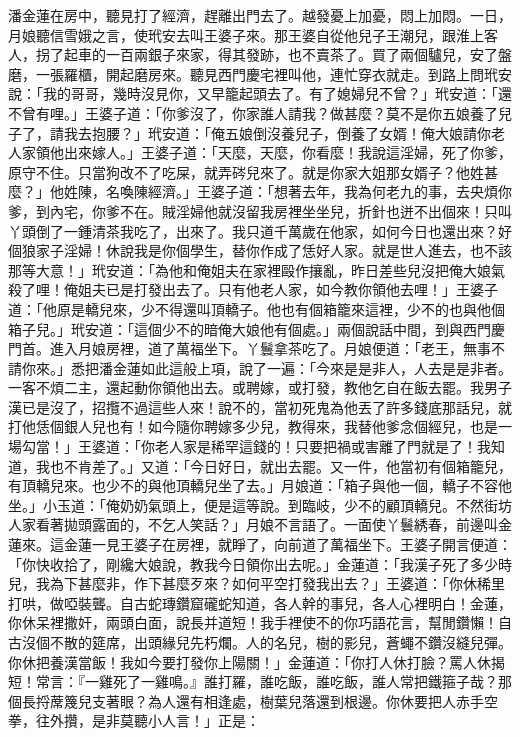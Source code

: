 \begin{showcontents}{}
潘金蓮在房中，聽見打了經濟，趕離出門去了。越發憂上加憂，悶上加悶。一日，月娘聽信雪娥之言，使玳安去叫王婆子來。那王婆自從他兒子王潮兒，跟淮上客人，拐了起車的一百兩銀子來家，得其發跡，也不賣茶了。買了兩個驢兒，安了盤磨，一張羅櫃，開起磨房來。聽見西門慶宅裡叫他，連忙穿衣就走。到路上問玳安說：「我的哥哥，幾時沒見你，又早籠起頭去了。有了媳婦兒不曾？」玳安道：「還不曾有哩。」王婆子道：「你爹沒了，你家誰人請我？做甚麼？莫不是你五娘養了兒子了，請我去抱腰？」玳安道：「俺五娘倒沒養兒子，倒養了女婿！俺大娘請你老人家領他出來嫁人。」王婆子道：「天麼，天麼，你看麼！我說這淫婦，死了你爹，原守不住。只當狗改不了吃屎，就弄硶兒來了。就是你家大姐那女婿子？他姓甚麼？」他姓陳，名喚陳經濟。」王婆子道：「想著去年，我為何老九的事，去央煩你爹，到內宅，你爹不在。賊淫婦他就沒留我房裡坐坐兒，折針也迸不出個來！只叫丫頭倒了一鍾清茶我吃了，出來了。我只道千萬歲在他家，如何今日也還出來？好個狼家子淫婦！休說我是你個學生，替你作成了恁好人家。就是世人進去，也不該那等大意！」玳安道：「為他和俺姐夫在家裡毆作攘亂，昨日差些兒沒把俺大娘氣殺了哩！俺姐夫已是打發出去了。只有他老人家，如今教你領他去哩！」王婆子道：「他原是轎兒來，少不得還叫頂轎子。他也有個箱籠來這裡，少不的也與他個箱子兒。」玳安道：「這個少不的暗俺大娘他有個處。」兩個說話中間，到與西門慶門首。進入月娘房裡，道了萬福坐下。丫鬟拿茶吃了。月娘便道：「老王，無事不請你來。」悉把潘金蓮如此這般上項，說了一遍：「今來是是非人，人去是是非者。一客不煩二主，還起動你領他出去。或聘嫁，或打發，教他乞自在飯去罷。我男子漢已是沒了，招攬不過這些人來！說不的，當初死鬼為他丟了許多錢底那話兒，就打他恁個銀人兒也有！如今隨你聘嫁多少兒，教得來，我替他爹念個經兒，也是一場勾當！」王婆道：「你老人家是稀罕這錢的！只要把禍或害離了門就是了！我知道，我也不肯差了。」又道：「今日好日，就出去罷。又一件，他當初有個箱籠兒，有頂轎兒來。也少不的與他頂轎兒坐了去。」月娘道：「箱子與他一個，轎子不容他坐。」小玉道：「俺奶奶氣頭上，便是這等說。到臨岐，少不的顧頂轎兒。不然街坊人家看著拋頭露面的，不乞人笑話？」月娘不言語了。一面使丫鬟綉春，前邊叫金蓮來。這金蓮一見王婆子在房裡，就睜了，向前道了萬福坐下。王婆子開言便道：「你快收拾了，剛纔大娘說，教我今日領你出去呢。」金蓮道：「我漢子死了多少時兒，我為下甚麼非，作下甚麼歹來？如何平空打發我出去？」王婆道：「你休稀里打哄，做啞裝聾。自古蛇瑼鑽窟礲蛇知道，各人幹的事兒，各人心裡明白！金蓮，你休呆裡撒奸，兩頭白面，說長并道短！我手裡使不的你巧語花言，幫閒鑽懶！自古沒個不散的筵席，出頭緣兒先朽爛。人的名兒，樹的影兒，蒼蠅不鑽沒縫兒彈。你休把養漢當飯！我如今要打發你上陽關！」金蓮道：「你打人休打臉？罵人休揭短！常言：『一雞死了一雞鳴。』誰打羅，誰吃飯，誰吃飯，誰人常把鐵箍子哉？那個長捋蓆篾兒支著眼？為人還有相逢處，樹葉兒落還到根邊。你休要把人赤手空拳，往外攢，是非莫聽小人言！」正是：


\end{showcontents}
